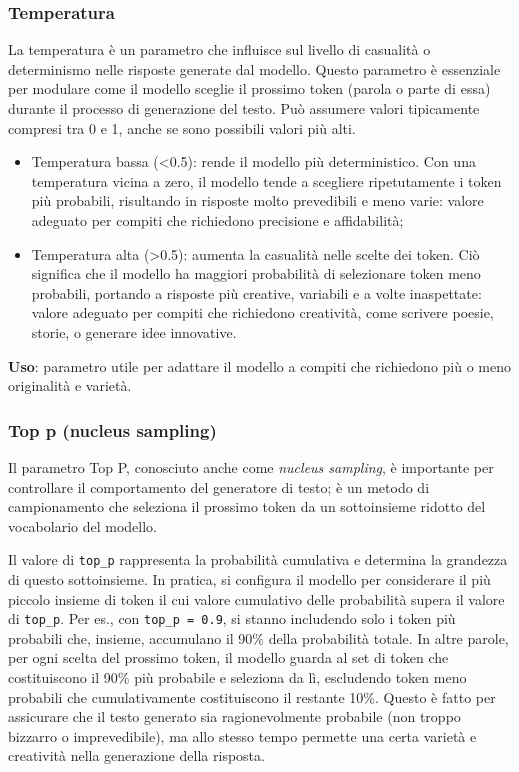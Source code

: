         \subsubsection{Temperatura}
            La temperatura è un parametro che influisce sul livello di casualità o determinismo nelle risposte generate dal modello. Questo parametro è essenziale per modulare come il modello sceglie il prossimo token (parola o parte di essa) durante il processo di generazione del testo.  Può assumere valori tipicamente compresi tra 0 e 1, anche se sono possibili valori più alti. 
            \begin{itemize}
                \item Temperatura bassa (<0.5): rende il modello più deterministico. Con una temperatura vicina a zero, il modello tende a scegliere ripetutamente i token più probabili, risultando in risposte molto prevedibili e meno varie: valore adeguato per compiti che richiedono precisione e affidabilità;
                
                \item Temperatura alta (>0.5): aumenta la casualità nelle scelte dei token. Ciò significa che il modello ha maggiori probabilità di selezionare token meno probabili, portando a risposte più creative, variabili e a volte inaspettate:  valore adeguato per compiti che richiedono creatività, come scrivere poesie, storie, o generare idee innovative. 
            \end{itemize}

            \textbf{Uso}: parametro utile per adattare il modello a compiti che richiedono più o meno originalità e varietà. 
            
        \subsubsection{Top p (nucleus sampling)}
            Il parametro Top P, conosciuto anche come \textit{nucleus sampling}, è importante per controllare il comportamento del generatore di testo; è un metodo di campionamento che seleziona il prossimo token da un sottoinsieme ridotto del vocabolario del modello.  

            Il valore di \texttt{top\_p} rappresenta la probabilità cumulativa e determina la grandezza di questo sottoinsieme. In pratica, si configura il modello per considerare il più piccolo insieme di token il cui valore cumulativo delle probabilità supera il valore di \texttt{top\_p}. Per es., con \texttt{top\_p = 0.9}, si stanno includendo solo i token più probabili che, insieme, accumulano il 90\% della probabilità totale. In altre parole, per ogni scelta del prossimo token, il modello guarda al set di token che costituiscono il 90\% più probabile e seleziona da lì, escludendo token meno probabili che cumulativamente costituiscono il restante 10\%. Questo è fatto per assicurare che il testo generato sia ragionevolmente probabile (non troppo bizzarro o imprevedibile), ma allo stesso tempo permette una certa varietà e creatività nella generazione della risposta.

